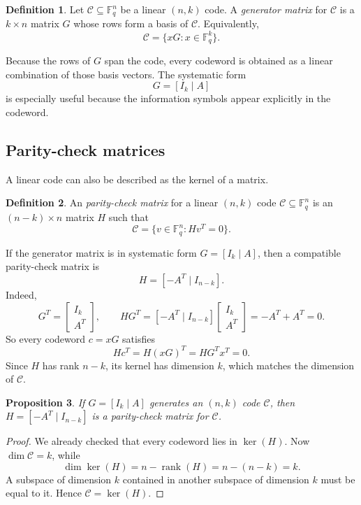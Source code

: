 \documentclass[11pt]{article}
\newtheorem{proposition}{Proposition}[section]
\theoremstyle{definition}
\newtheorem{definition}[proposition]{Definition}
\theoremstyle{remark}
\newcommand{\F}{\mathbb{F}}
\newcommand{\code}{\mathcal{C}}
\begin{document}
\begin{definition}
Let $\code\subseteq \F_q^n$ be a linear $(n,k)$ code. A \emph{generator matrix} for $\code$ is a $k\times n$ matrix $G$ whose rows form a basis of $\code$. Equivalently,
\[
\code=\{xG:x\in\F_q^k\}.
\]
\end{definition}

Because the rows of $G$ span the code, every codeword is obtained as a linear combination of those basis vectors. The systematic form
\[
G=[I_k\mid A]
\]
is especially useful because the information symbols appear explicitly in the codeword.

\subsection{Parity-check matrices}

A linear code can also be described as the kernel of a matrix.

\begin{definition}
An \emph{parity-check matrix} for a linear $(n,k)$ code $\code\subseteq \F_q^n$ is an $(n-k)\times n$ matrix $H$ such that
\[
\code=\{v\in\F_q^n:Hv^T=0\}.
\]
\end{definition}

If the generator matrix is in systematic form $G=[I_k\mid A]$, then a compatible parity-check matrix is
\[
H=[-A^T\mid I_{n-k}].
\]
Indeed,
\[
G^T=
\begin{bmatrix}
I_k\\
A^T
\end{bmatrix},
\qquad
HG^T=[-A^T\mid I_{n-k}]
\begin{bmatrix}
I_k\\
A^T
\end{bmatrix}
=-A^T+A^T=0.
\]
So every codeword $c=xG$ satisfies
\[
Hc^T=H(xG)^T=HG^Tx^T=0.
\]
Since $H$ has rank $n-k$, its kernel has dimension $k$, which matches the dimension of $\code$.

\begin{proposition}
If $G=[I_k\mid A]$ generates an $(n,k)$ code $\code$, then $H=[-A^T\mid I_{n-k}]$ is a parity-check matrix for $\code$.
\end{proposition}

\begin{proof}
We already checked that every codeword lies in $\ker(H)$. Now $\dim \code=k$, while
\[
\dim \ker(H)=n-\operatorname{rank}(H)=n-(n-k)=k.
\]
A subspace of dimension $k$ contained in another subspace of dimension $k$ must be equal to it. Hence $\code=\ker(H)$.
\end{proof}
\end{document}
